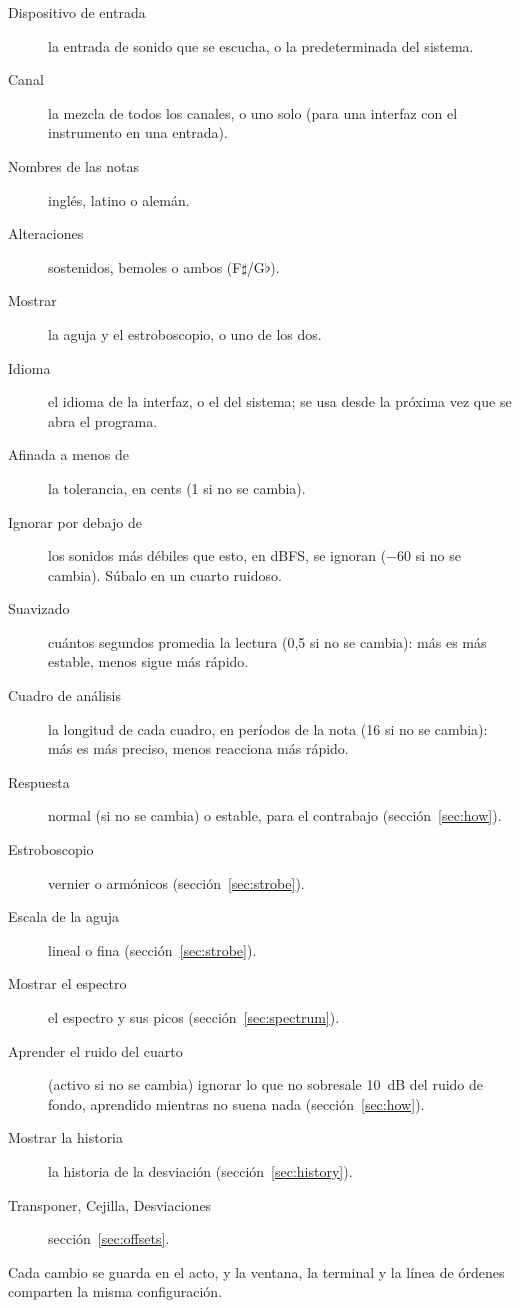\documentclass[12pt,
              article,
              oneside
              ]{memoir}
\begin{document}
\begin{description}
\item[Dispositivo de entrada] la entrada de sonido que se escucha, o la
  predeterminada del sistema.
\item[Canal] la mezcla de todos los canales, o uno solo (para una interfaz
  con el instrumento en una entrada).
\item[Nombres de las notas] inglés, latino o alemán.
\item[Alteraciones] sostenidos, bemoles o ambos (F$\sharp$/G$\flat$).
\item[Mostrar] la aguja y el estroboscopio, o uno de los dos.
\item[Idioma] el idioma de la interfaz, o el del sistema; se usa desde la
  próxima vez que se abra el programa.
\item[Afinada a menos de] la tolerancia, en cents (1 si no se cambia).
\item[Ignorar por debajo de] los sonidos más débiles que esto, en dBFS, se
  ignoran ($-60$ si no se cambia). Súbalo en un cuarto ruidoso.
\item[Suavizado] cuántos segundos promedia la lectura (0,5 si no se
  cambia): más es más estable, menos sigue más rápido.
\item[Cuadro de análisis] la longitud de cada cuadro, en períodos de la
  nota (16 si no se cambia): más es más preciso, menos reacciona más rápido.
\item[Respuesta] normal (si no se cambia) o estable, para el contrabajo
  (sección~\ref{sec:how}).
\item[Estroboscopio] vernier o armónicos (sección~\ref{sec:strobe}).
\item[Escala de la aguja] lineal o fina (sección~\ref{sec:strobe}).
\item[Mostrar el espectro] el espectro y sus picos
  (sección~\ref{sec:spectrum}).
\item[Aprender el ruido del cuarto] (activo si no se cambia) ignorar lo que
  no sobresale 10~dB del ruido de fondo, aprendido mientras no suena nada
  (sección~\ref{sec:how}).
\item[Mostrar la historia] la historia de la desviación
  (sección~\ref{sec:history}).
\item[Transponer, Cejilla, Desviaciones] sección~\ref{sec:offsets}.
\end{description}

\noindent Cada cambio se guarda en el acto, y la ventana, la terminal y la
línea de órdenes comparten la misma configuración.
\end{document}
